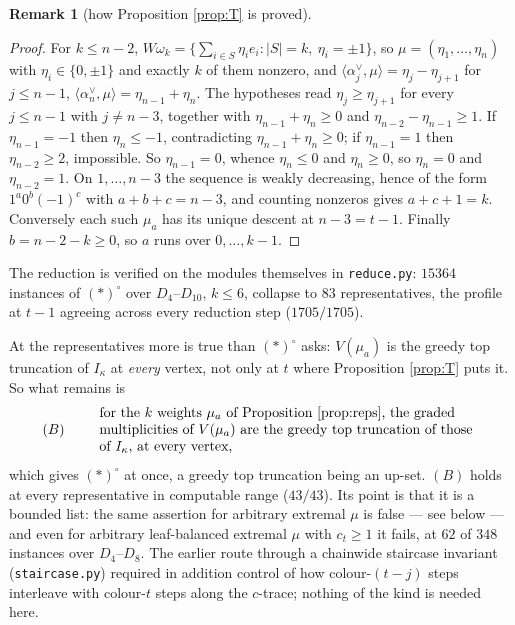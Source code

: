 \documentclass[11pt,reqno]{amsart}
\theoremstyle{plain}
\theoremstyle{definition}
\newtheorem{remark}[theorem]{Remark}
\newcommand{\al}{\alpha}
\newcommand{\om}{\omega}
\newcommand{\ka}{\kappa}
\begin{document}
\begin{remark}[how Proposition \ref{prop:T} is proved]
\begin{proof}
For $k\le n-2$, $W\om_k=\{\sum_{i\in S}\eta_ie_i:|S|=k,\ \eta_i=\pm1\}$, so
$\mu=(\eta_1,\dots,\eta_n)$ with $\eta_i\in\{0,\pm1\}$ and exactly $k$ of them
nonzero, and $\langle\al_j^\vee,\mu\rangle=\eta_j-\eta_{j+1}$ for $j\le n-1$,
$\langle\al_n^\vee,\mu\rangle=\eta_{n-1}+\eta_n$.  The hypotheses read
$\eta_j\ge\eta_{j+1}$ for every $j\le n-1$ with $j\ne n-3$, together with
$\eta_{n-1}+\eta_n\ge0$ and $\eta_{n-2}-\eta_{n-1}\ge1$.  If $\eta_{n-1}=-1$
then $\eta_n\le-1$, contradicting $\eta_{n-1}+\eta_n\ge0$; if $\eta_{n-1}=1$
then $\eta_{n-2}\ge2$, impossible.  So $\eta_{n-1}=0$, whence $\eta_n\le0$ and
$\eta_n\ge0$, so $\eta_n=0$ and $\eta_{n-2}=1$.  On $1,\dots,n-3$ the sequence
is weakly decreasing, hence of the form $1^a0^b(-1)^c$ with $a+b+c=n-3$, and
counting nonzeros gives $a+c+1=k$.  Conversely each such $\mu_a$ has its unique
descent at $n-3=t-1$.  Finally $b=n-2-k\ge0$, so $a$ runs over $0,\dots,k-1$.
\end{proof}

The reduction is verified on the modules themselves in \texttt{reduce.py}:
$15364$ instances of $(*)^{\circ}$ over $D_4$--$D_{10}$, $k\le6$, collapse to
$83$ representatives, the profile at $t-1$ agreeing across every reduction step
($1705/1705$).

At the representatives more is true than $(*)^{\circ}$ asks: $V(\mu_a)$ is the
greedy top truncation of $I_\ka$ at \emph{every} vertex, not only at $t$ where
Proposition \ref{prop:T} puts it.  So what remains is
\[
   (B)\qquad
   \begin{array}{l}
   \text{for the $k$ weights $\mu_a$ of Proposition \ref{prop:reps}, the graded}\\
   \text{multiplicities of $V(\mu_a)$ are the greedy top truncation of those}\\
   \text{of $I_\ka$, at every vertex,}
   \end{array}
\]
which gives $(*)^{\circ}$ at once, a greedy top truncation being an up-set.
$(B)$ holds at every representative in computable range ($43/43$).  Its point
is that it is a bounded list: the same assertion for arbitrary extremal $\mu$
is false --- see below --- and even for arbitrary leaf-balanced extremal $\mu$
with $c_t\ge1$ it fails, at $62$ of $348$ instances over $D_4$--$D_8$.  The
earlier route through a chainwide staircase invariant (\texttt{staircase.py})
required in addition control of how colour-$(t-j)$ steps interleave with
colour-$t$ steps along the $c$-trace; nothing of the kind is needed here.


\end{remark}
\end{document}
